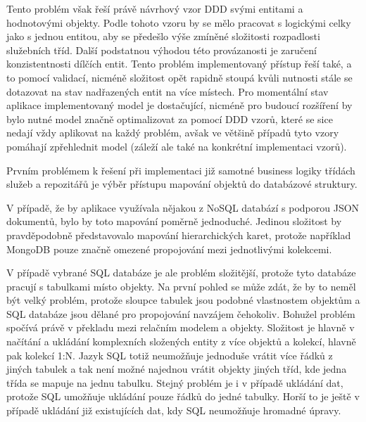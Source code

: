 \begin{itemize}
\begin{itemize}
		Tento problém však řeší právě návrhový vzor \ac{DDD} svými entitami a hodnotovými objekty.
		Podle tohoto vzoru by se mělo pracovat s logickými celky jako s jednou entitou, aby se předešlo výše zmíněné složitosti
		rozpadlosti služebních tříd.
		Další podstatnou výhodou této provázanosti je zaručení konzistentnosti dílčích entit.
		Tento problém implementovaný přístup řeší také, a to pomocí validací, nicméně složitost opět rapidně stoupá kvůli
		nutnosti stále se dotazovat na stav nadřazených entit na více místech.
		\cite{ddd_quickly}
		Pro momentální stav aplikace implementovaný model je dostačující, nicméně pro budoucí rozšíření by bylo nutné
		model značně optimalizovat za pomocí \ac{DDD} vzorů, které se sice nedají vždy aplikovat na každý problém, avšak
		ve většině případů tyto vzory pomáhají zpřehlednit model (záleží ale také na konkrétní implementaci vzorů).



		Prvním problémem k řešení při implementaci již samotné business logiky třídách služeb a repozitářů je výběr
		přístupu mapování objektů do databázové struktury.

		V případě, že by aplikace využívala nějakou z \ac{NoSQL} databází s podporou \ac{JSON} dokumentů, bylo by toto
		mapování poměrně jednoduché.
		Jedinou složitost by pravděpodobně představovalo mapování hierarchických karet, protože například MongoDB pouze
		značně omezené propojování mezi jednotlivými kolekcemi.

		V případě vybrané \ac{SQL} databáze je ale problém složitější, protože tyto databáze pracují s tabulkami místo objekty.
		Na první pohled se může zdát, že by to neměl být velký problém, protože sloupce tabulek jsou podobné vlastnostem
		objektům a \ac{SQL} databáze jsou dělané pro propojování navzájem čehokoliv.
		Bohužel problém spočívá právě v překladu mezi relačním modelem a objekty.
		Složitost je hlavně v načítání a ukládání komplexních složených entity z více objektů a kolekcí, hlavně pak
		kolekcí 1:N.
		Jazyk \ac{SQL} totiž neumožňuje jednoduše vrátit více řádků z jiných tabulek a tak není možné najednou
		vrátit objekty jiných tříd, kde jedna třída se mapuje na jednu tabulku.
		Stejný problém je i v případě ukládání dat, protože \ac{SQL} umožňuje ukládání pouze řádků do jedné tabulky.
		Horší to je ještě v případě ukládání již existujících dat, kdy \ac{SQL} neumožňuje hromadné úpravy.


\end{itemize}
\end{itemize}
